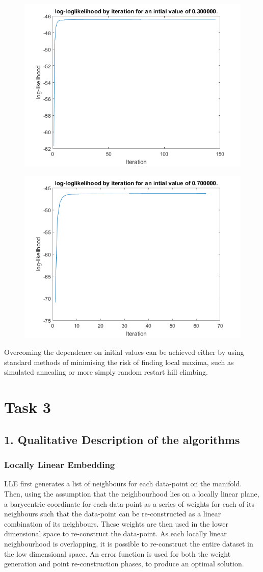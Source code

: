 \documentclass{article}
\begin{document}
\begin{figure}[h!]
\centering
\includegraphics[width=0.7\linewidth]{images/LL3}
\label{fig:LL2}
\end{figure}
\begin{figure}[h!]
\centering
\includegraphics[width=0.7\linewidth]{images/LL7}
\label{fig:LL7}
\end{figure}
Overcoming the dependence on initial values can be achieved either by using standard methods of minimising the risk of finding local maxima, such as simulated annealing or more simply random restart hill climbing. 

\section{Task 3}
\subsection{1. Qualitative Description of the algorithms}
\subsubsection{Locally Linear Embedding}
LLE first generates a list of neighbours for each data-point on the manifold. Then, using the assumption that the neighbourhood lies on a locally linear plane, a barycentric coordinate for each data-point as a series of weights for each of its neighbours such that the data-point can be re-constructed as a linear combination of its neighbours. These weights are then used in the lower dimensional space to re-construct the data-point. As each locally linear neighbourhood is overlapping, it is possible to re-construct the entire dataset in the low dimensional space. An error function is used for both the weight generation and point re-construction phases, to produce an optimal solution.
\end{document}
